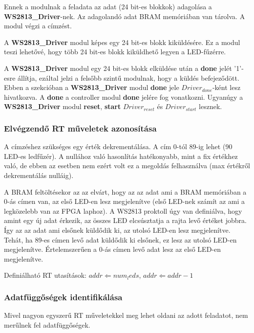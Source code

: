 \tab Ennek a modulnak a feladata az adat (24 bit-es blokkok) adagolása a \textbf{WS2813\_Driver}-nek. Az adagolandó adat BRAM memóriában van tárolva. A modul végzi a címzést.

\tab A \textbf{WS2813\_Driver} modul képes egy 24 bit-es blokk kiküldésére. Ez a modul teszi lehetővé, hogy több 24 bit-es blokk kiküldhető legyen a LED-fűzérre.

\tab A \textbf{WS2813\_Driver} modul egy 24 bit-es blokk elküldése után a \textbf{done} jelét '1'-esre állítja, ezáltal jelzi a felsőbb szintű modulnak, hogy a küldés befejeződött.
Ebben a szekcióban a \textbf{WS2813\_Driver} modul \textbf{done} jele $Driver_{done}$-ként lesz hivatkozva. A \textbf{done} a controller modul \textbf{done} jelére fog vonatkozni.
Ugyanúgy a \textbf{WS2813\_Driver} modul \textbf{reset}, \textbf{start} $Driver_{reset}$ és $Driver_{start}$ lesznek.

\subsubsection{Elvégzendő RT műveletek azonosítása}

\tab A címzéshez szükséges egy érték dekrementálása. A cím 0-tól 89-ig lehet (90 LED-es ledfűzér). A nullához való hasonlítás hatékonyabb, mint a fix értékhez való,
de ebben az esetben nem ezért volt ez a megoldás felhasználva (max értékről dekrementálás nulláig). 

\tab A BRAM feltöltésekor az az elvárt, hogy az az adat ami a BRAM memóriában a 0-ás címen van, az első LED-en lesz megjelenítve
(első LED-nek számít az ami a legközelebb van az FPGA laphoz). A WS2813 proktoll úgy van definiálva, hogy amint egy új adat érkezik, az összes LED elcsúsztatja a rajta levő értéket jobbra.
Így az az adat ami elsőnek küldődik ki, az utolsó LED-en lesz megjelenítve. Tehát, ha 89-es címen levő adat küldődik ki elsőnek, ez lesz az utolsó LED-en megjelenítve. Értelemszerűen a 0-ás címen
levő adat lesz az első LED-en megjelenítve.

\tab Definiálható RT utasítások: $addr \Leftarrow num_leds$, $addr \Leftarrow addr - 1$

\subsubsection{Adatfüggőségek identifikálása}

\tab Mivel nagyon egyszerű RT műveletekkel meg lehet oldani az adott feladatot, nem merűlnek fel adatfüggőségek.

